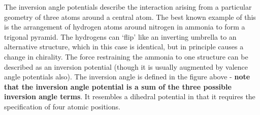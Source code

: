 The inversion angle potentials describe
the interaction arising from a particular geometry of three atoms
around a central atom.  The best known example of this is the
arrangement of hydrogen atoms around nitrogen in ammonia to form a
trigonal pyramid.  The hydrogens can `flip' like an inverting
umbrella to an alternative structure, which in this case is
identical, but in principle causes a change in chirality.  The
force restraining the ammonia to one structure can be described as
an inversion potential (though it is
usually augmented by valence angle
potentials also).  The inversion angle is defined in the figure
above - {\bf note that the inversion
angle potential is a sum of the three possible
inversion angle terms}.  It resembles a
dihedral potential in that it requires
the specification of four atomic positions.

